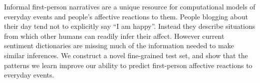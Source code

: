 Informal first-person narratives are a unique resource for computational models of everyday events and people's affective reactions to them.  People blogging about their day tend not to explicitly say ``I am happy''. Instead they describe situations from which other humans can readily infer their affect. However current sentiment dictionaries are missing much of the information needed to make similar inferences. We construct a novel fine-grained test set, and show that the patterns we learn improve our ability to predict first-person affective reactions to everyday events.
